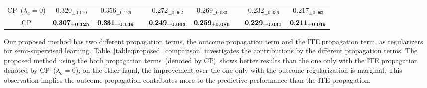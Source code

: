 \begin{table}[tbp]
\begin{tabular} {ccccccccc }
CP~($\lambda_e=0$) &        $0.320_{\pm{0.110}}$       &       $0.356_{\pm{0.126}}$         & \multicolumn{1}{l}{} &     $ 0.272_{\pm{0.062}}$   &   $0.269_{\pm{0.083}}$      &      &  $0.232_{\pm{0.036}}$  & $0.217_{\pm{0.063}}$        \\[3pt]


CP &       $\bf 0.307_{\pm{0.125}}$ & $\bf 0.331_{\pm{0.149}}$        & \multicolumn{1}{l}{} &     $\bf 0.249_{\pm{0.063}}$          & $\bf 0.259_{\pm{0.086}}$       &  &   $\bf 0.229_{\pm{0.031}} $& $\bf 0.211_{\pm{0.049}}$      \\[3pt]
\bottomrule[2pt]
    \end{tabular}
\end{table}







Our proposed method has two different propagation terms, the outcome propagation term and the ITE propagation term, as regularizers for semi-supervised learning. 
Table~\ref{table:proposed_comparison} investigates the contributions by the different propagation terms. 
The proposed method using the both propagation terms~(denoted by CP)~shows better results than the one only with the ITE propagation denoted by CP~($\lambda_o=0$); on the other hand, the improvement over the one only with the outcome regularization is marginal.
This observation implies the outcome propagation contributes more to the predictive performance than the ITE propagation.

